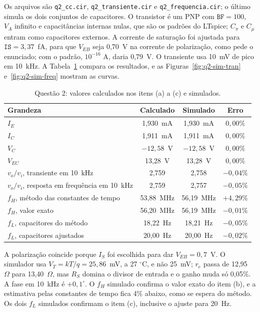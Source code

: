\documentclass[12pt,a4paper]{report}
\begin{document}
Os arquivos são \texttt{q2\_cc.cir}, \texttt{q2\_transiente.cir} e \texttt{q2\_frequencia.cir}; o último simula os dois conjuntos de capacitores. O transistor é um PNP com $\texttt{BF} = 100$, $V_A$ infinito e capacitâncias internas nulas, que são os padrões do LTspice; $C_\pi$ e $C_\mu$ entram como capacitores externos. A corrente de saturação foi ajustada para $\texttt{IS} = 3{,}37$~fA, para que $V_{EB}$ seja 0,70~V na corrente de polarização, como pede o enunciado; com o padrão, $10^{-16}$ A, daria 0,79~V. O transiente usa 10~mV de pico em 10~kHz. A Tabela~\ref{tab:q2-sim} compara os resultados, e as Figuras~\ref{fig:q2-sim-tran} e~\ref{fig:q2-sim-freq} mostram as curvas.

\begin{table}[H]
\centering
\caption{Questão 2: valores calculados nos itens (a) a (c) e simulados.}
\label{tab:q2-sim}
\begin{tabular}{lccc}
\toprule
Grandeza & Calculado & Simulado & Erro \\
\midrule
$I_E$ & 1,930~mA & 1,930~mA & $0{,}00\%$ \\
$I_C$ & 1,911~mA & 1,911~mA & $0{,}00\%$ \\
$V_C$ & $-12{,}58$~V & $-12{,}58$~V & $0{,}00\%$ \\
$V_{EC}$ & 13,28~V & 13,28~V & $0{,}00\%$ \\
$v_o/v_i$, transiente em 10~kHz & 2,759 & 2,758 & $-0{,}04\%$ \\
$v_o/v_i$, resposta em frequência em 10~kHz & 2,759 & 2,757 & $-0{,}05\%$ \\
$f_H$, método das constantes de tempo & 53,88~MHz & 56,19~MHz & $+4{,}29\%$ \\
$f_H$, valor exato & 56,20~MHz & 56,19~MHz & $-0{,}01\%$ \\
$f_L$, capacitores do método & 18,22~Hz & 18,21~Hz & $-0{,}05\%$ \\
$f_L$, capacitores ajustados & 20,00~Hz & 20,00~Hz & $-0{,}02\%$ \\
\bottomrule
\end{tabular}
\end{table}

A polarização coincide porque $I_S$ foi escolhida para dar $V_{EB} = 0{,}7$~V. O simulador usa $V_T = kT/q = 25{,}86$~mV, a 27 $^\circ$C, e não 25~mV; $r_e$ passa de 12,95~$\Omega$ para 13,40~$\Omega$, mas $R_S$ domina o divisor de entrada e o ganho muda só 0,05\%. A fase em 10~kHz é $+0{,}1^\circ$. O $f_H$ simulado confirma o valor exato do item (b), e a estimativa pelas constantes de tempo fica 4\% abaixo, como se espera do método. Os dois $f_L$ simulados confirmam o item (c), inclusive o ajuste para 20~Hz.
\end{document}
